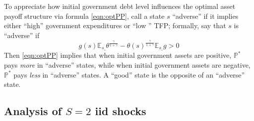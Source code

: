 \documentclass[12pt]{article}
\newcommand{\EE}{\mathbb E}
\begin{document}
To appreciate how  initial government debt level influences the optimal asset payoff structure via formula \eqref{eqn:optPP}, call a
 state $s$ ``adverse''  if it implies either ``high'' government expenditures or ``low '' TFP; formally, say that  $s$ is ``adverse'' if
\[   g(s)\EE_{s\_}\theta^\frac{\gamma}{1+\gamma}-\theta(s)^\frac\gamma{1+\gamma}\EE_{s\_} g >0\]
Then \eqref{eqn:optPP} implies that
 when initial government assets are positive, $\mathbb{P}^*$   pays {\em more} in ``adverse'' states, while when initial government assets are
 negative, $\mathbb{P}^*$  pays {\em less} in ``adverse'' states.  A ``good'' state is the opposite of an ``adverse'' state.

%
%		
%	
%			

\subsection{Analysis of $S=2$ iid shocks} %
\end{document}
